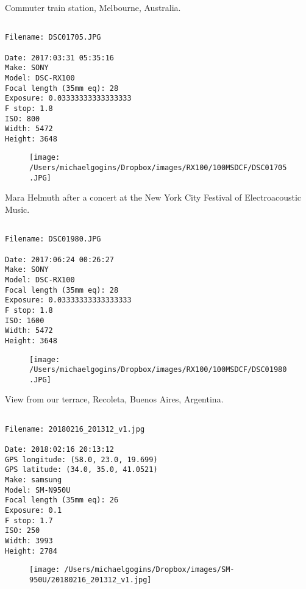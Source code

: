 \documentclass[11pt,letter,DIV=14,paper=landscape]{scrbook}
\begin{document}
\clearpage
\noindent Commuter train station, Melbourne, Australia.
\noindent
\begin{lstlisting}

Filename: DSC01705.JPG

Date: 2017:03:31 05:35:16
Make: SONY
Model: DSC-RX100
Focal length (35mm eq): 28
Exposure: 0.03333333333333333
F stop: 1.8
ISO: 800
Width: 5472
Height: 3648
\end{lstlisting}
\clearpage

\begin{figure}
\texttt{[image: /Users/michaelgogins/Dropbox/images/RX100/100MSDCF/DSC01705.JPG]}
\end{figure}
    
\clearpage
\noindent Mara Helmuth after a concert at the New York City Festival of Electroacoustic Music.
\noindent
\begin{lstlisting}

Filename: DSC01980.JPG

Date: 2017:06:24 00:26:27
Make: SONY
Model: DSC-RX100
Focal length (35mm eq): 28
Exposure: 0.03333333333333333
F stop: 1.8
ISO: 1600
Width: 5472
Height: 3648
\end{lstlisting}
\clearpage

\begin{figure}
\texttt{[image: /Users/michaelgogins/Dropbox/images/RX100/100MSDCF/DSC01980.JPG]}
\end{figure}
    
\clearpage
\noindent View from our terrace, Recoleta, Buenos Aires, Argentina.
\noindent
\begin{lstlisting}

Filename: 20180216_201312_v1.jpg

Date: 2018:02:16 20:13:12
GPS longitude: (58.0, 23.0, 19.699)
GPS latitude: (34.0, 35.0, 41.0521)
Make: samsung
Model: SM-N950U
Focal length (35mm eq): 26
Exposure: 0.1
F stop: 1.7
ISO: 250
Width: 3993
Height: 2784
\end{lstlisting}
\clearpage

\begin{figure}
\texttt{[image: /Users/michaelgogins/Dropbox/images/SM-950U/20180216\_201312\_v1.jpg]}
\end{figure}
    
\end{document}
